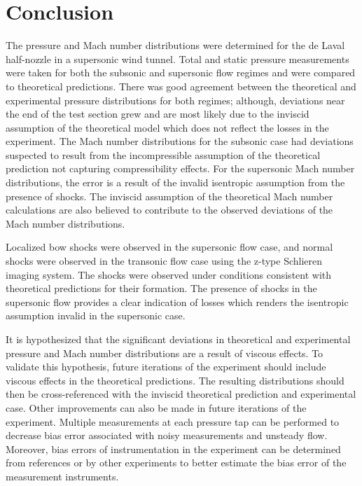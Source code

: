 \documentclass[runningheads]{llncs}
\begin{document}


\section{Conclusion}

The pressure and Mach number distributions were determined for the de Laval half-nozzle in a supersonic wind tunnel. Total and static pressure measurements were taken for both the subsonic and supersonic flow regimes and were compared to theoretical predictions. There was good agreement between the theoretical and experimental pressure distributions for both regimes; although, deviations near the end of the test section grew and are most likely due to the inviscid assumption of the theoretical model which does not reflect the losses in the experiment. The Mach number distributions for the subsonic case had deviations suspected to result from the incompressible assumption of the theoretical prediction not capturing compressibility effects. For the supersonic Mach number distributions, the error is a result of the invalid isentropic assumption from the presence of shocks. The inviscid assumption of the theoretical Mach number calculations are also believed to contribute to the observed deviations of the Mach number distributions.\newline

\noindent
Localized bow shocks were observed in the supersonic flow case, and normal shocks were observed in the transonic flow case using the z-type Schlieren imaging system. The shocks were observed under conditions consistent with theoretical predictions for their formation. The presence of shocks in the supersonic flow provides a clear indication of losses which renders the isentropic assumption invalid in the supersonic case. \newline

\noindent
It is hypothesized that the significant deviations in theoretical and experimental pressure and Mach number distributions are a result of viscous effects. To validate this hypothesis, future iterations of the experiment should include viscous effects in the theoretical predictions. The resulting distributions should then be cross-referenced with the inviscid theoretical prediction and experimental case.
Other improvements can also be made in future iterations of the experiment. Multiple measurements at each pressure tap can be performed to decrease bias error associated with noisy measurements and unsteady flow. Moreover, bias errors of instrumentation in the experiment can be determined from references or by other experiments to better estimate the bias error of the measurement instruments. \newline
\end{document}

